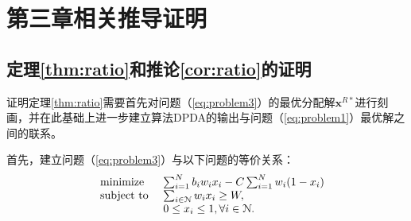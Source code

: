 \chapter{第三章相关推导证明}\label{sec:appA}
\section{定理\ref{thm:ratio}和推论\ref{cor:ratio}的证明}\label{pf:thm:ratio}
证明定理\ref{thm:ratio}需要首先对问题（\ref{eq:problem3}）的最优分配解$\mathbf{x}^{R*}$进行刻画，并在此基础上进一步建立算法DPDA的输出与问题（\ref{eq:problem1}）最优解之间的联系。
	
	首先，建立问题（\ref{eq:problem3}）与以下问题的等价关系：
	\begin{equation}%
	\hspace{-0.0cm}
	\begin{array}
	[c]{lll}%
	&{\text{minimize}}&~\sum_{i=1}^{N}b_iw_ix_i-C\sum_{i=1}^{N}w_i(1-x_i)
	\\
	&\text{subject to}&~ \sum_{i\in\N}w_ix_i\ge W,\\
	&&~ 0\le x_i\le 1, \forall i\in\N.
	\end{array}
	\label{eq:problem4}
	\end{equation}
	
